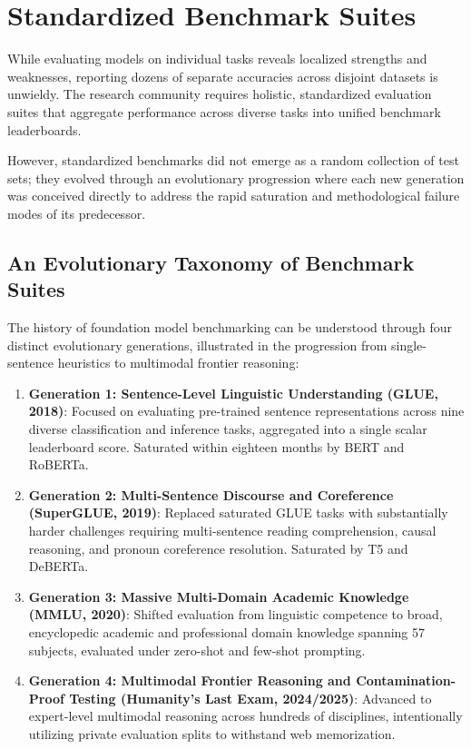 \documentclass[../../../main.tex]{subfiles}
\begin{document}
\clearpage

\section{Standardized Benchmark Suites}
\label{sec:benchmarks_contamination}

While evaluating models on individual tasks reveals localized strengths and weaknesses, reporting dozens of separate accuracies across disjoint datasets is unwieldy. The research community requires holistic, standardized evaluation suites that aggregate performance across diverse tasks into unified benchmark leaderboards.

However, standardized benchmarks did not emerge as a random collection of test sets; they evolved through an evolutionary progression where each new generation was conceived directly to address the rapid saturation and methodological failure modes of its predecessor.

\subsection{An Evolutionary Taxonomy of Benchmark Suites}
\label{subsec:benchmark_evolutionary_taxonomy}

The history of foundation model benchmarking can be understood through four distinct evolutionary generations, illustrated in the progression from single-sentence heuristics to multimodal frontier reasoning:
\begin{enumerate}
    \item \textbf{Generation 1: Sentence-Level Linguistic Understanding (GLUE, 2018)}: Focused on evaluating pre-trained sentence representations across nine diverse classification and inference tasks, aggregated into a single scalar leaderboard score. Saturated within eighteen months by BERT and RoBERTa.
    \item \textbf{Generation 2: Multi-Sentence Discourse and Coreference (SuperGLUE, 2019)}: Replaced saturated GLUE tasks with substantially harder challenges requiring multi-sentence reading comprehension, causal reasoning, and pronoun coreference resolution. Saturated by T5 and DeBERTa.
    \item \textbf{Generation 3: Massive Multi-Domain Academic Knowledge (MMLU, 2020)}: Shifted evaluation from linguistic competence to broad, encyclopedic academic and professional domain knowledge spanning 57 subjects, evaluated under zero-shot and few-shot prompting.
    \item \textbf{Generation 4: Multimodal Frontier Reasoning and Contamination-Proof Testing (Humanity's Last Exam, 2024/2025)}: Advanced to expert-level multimodal reasoning across hundreds of disciplines, intentionally utilizing private evaluation splits to withstand web memorization.
\end{enumerate}
\end{document}
